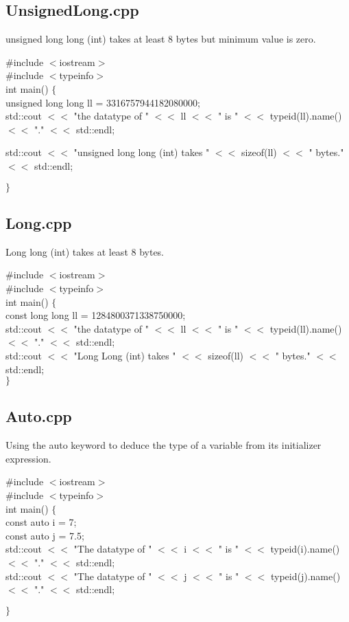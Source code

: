 \documentclass[11pt]{report}
\begin{document}
\subsection{UnsignedLong.cpp}
\label{Appendix B: unsignedLong}
{\scriptsize unsigned long long (int) takes at least 8 bytes but minimum value is zero.}

{\scriptsize
\#include $<$iostream$>$ \\
\#include $<$typeinfo$>$ \\

int main() $\lbrace$\\
  unsigned long long ll = 3316757944182080000;\\

  std::cout $<<$ "the datatype of " $<<$ ll $<<$ " is " $<<$ typeid(ll).name() $<<$ "." $ <<$ std::endl;

  std::cout $<<$ "unsigned long long (int) takes " $<<$ sizeof(ll) $<<$ " bytes." $<<$ std::endl;

$\rbrace$
}
\subsection{Long.cpp}
\label{LongLong}
{\scriptsize Long long (int) takes at least 8 bytes.}

{\scriptsize
\#include $<$iostream$>$\\
\#include $<$typeinfo$>$\\

int main() $\lbrace$\\
  const long long ll = 1284800371338750000;\\

std::cout $<<$ "the datatype of " $<<$ ll $<<$ " is " $<<$ typeid(ll).name() $<<$ "." $ <<$ std::endl;\\
std::cout $<<$ "Long Long (int) takes " $<<$ sizeof(ll) $<<$ " bytes." $<<$ std::endl;\\
$\rbrace$
}

\subsection{Auto.cpp}
\label{Auto}
{\scriptsize Using the auto keyword to deduce the type of a variable from its initializer expression.}

{\scriptsize
\#include $<$iostream$>$\\
\#include $<$typeinfo$>$\\

int main() $\lbrace$\\
  const auto i = 7;\\
  const auto j = 7.5;\\

  std::cout $<<$ "The datatype of  " $<<$ i $<<$ " is " $<<$ typeid(i).name() $<<$ "." $<<$ std::endl;\\
  std::cout $<<$ "The datatype of  " $<<$ j $<<$ " is " $<<$ typeid(j).name() $<<$ "." $<<$ std::endl;

$\rbrace$
}
\end{document}
